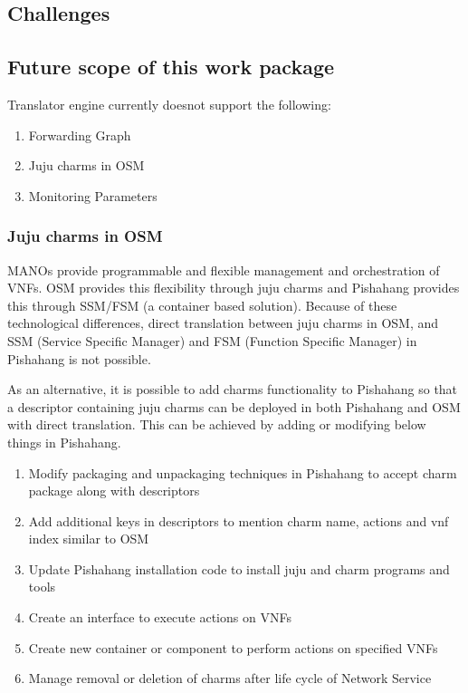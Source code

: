 \subsection{Challenges}

\subsection{Future scope of this work package}

Translator engine currently doesnot support the following:
\begin{enumerate}
	\item Forwarding Graph
	\item Juju charms in OSM
	\item Monitoring Parameters
\end{enumerate}

\subsubsection{Juju charms in OSM}
MANOs provide programmable and flexible management and orchestration of VNFs. OSM provides this flexibility through juju charms and Pishahang provides this through SSM/FSM (a container based solution). Because of these technological differences, direct translation between juju charms in OSM, and SSM (Service Specific Manager) and FSM (Function Specific Manager) in Pishahang is not possible. 

As an alternative, it is possible to add charms functionality to Pishahang so that a descriptor containing juju charms can be deployed in both Pishahang and OSM with direct translation. This can be achieved by adding or modifying below things in Pishahang.
\begin{enumerate}
	\item Modify packaging and unpackaging techniques in Pishahang to accept charm package along with descriptors
	\item Add additional keys in descriptors to mention charm name, actions and vnf index similar to OSM
	\item Update Pishahang installation code to install juju and charm programs and tools
	\item Create an interface to execute actions on VNFs
	\item Create new container or component to perform actions on specified VNFs
	\item Manage removal or deletion of charms after life cycle of Network Service 
\end{enumerate} 

